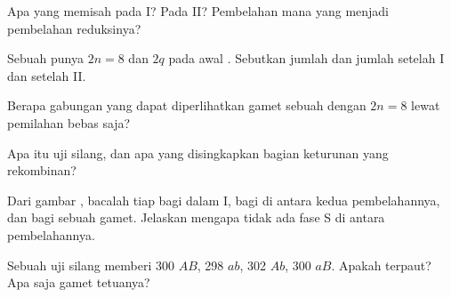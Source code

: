 \begin{exercise}[$\star$]\label{exo:g12:meiosis-genetic-shuffling:2}
Apa yang memisah pada  I? Pada  II? Pembelahan mana yang
menjadi pembelahan reduksinya?
\end{exercise}

\begin{exercise}[$\star$]\label{exo:g12:meiosis-genetic-shuffling:3}
Sebuah  punya $2n = 8$ dan  $2q$ pada awal . Sebutkan
jumlah  dan jumlah   setelah  I dan setelah
 II.
\end{exercise}

\begin{exercise}[$\star$]\label{exo:g12:meiosis-genetic-shuffling:4}
Berapa gabungan  yang dapat diperlihatkan gamet sebuah 
dengan $2n = 8$ lewat pemilahan bebas saja?
\end{exercise}

\begin{exercise}[$\star$]\label{exo:g12:meiosis-genetic-shuffling:5}
Apa itu uji silang, dan apa yang disingkapkan bagian keturunan yang
rekombinan?
\end{exercise}

\begin{exercise}[$\star\star$]\label{exo:g12:meiosis-genetic-shuffling:6}
Dari gambar , bacalah  tiap  bagi  dalam  I,
bagi  di antara kedua pembelahannya, dan bagi sebuah gamet.
Jelaskan mengapa tidak ada fase S di antara pembelahannya.
\end{exercise}

\begin{exercise}[$\star\star$]\label{exo:g12:meiosis-genetic-shuffling:7}
Sebuah uji silang memberi 300 $AB$, 298 $ab$, 302 $Ab$, 300 $aB$.
Apakah  terpaut? Apa saja gamet tetuanya?
\end{exercise}

